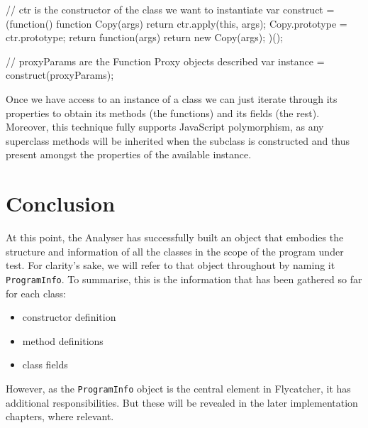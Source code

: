 \begin{code}[caption=Instantiating a \textit{Function} object,label=instantiatingfn]
// ctr is the constructor of the class we want to instantiate
var construct = (function() {
    function Copy(args) {
        return ctr.apply(this, args);
    }
    Copy.prototype = ctr.prototype;
    return function(args) {
        return new Copy(args);
    }
})();

// proxyParams are the Function Proxy objects described
var instance = construct(proxyParams);
\end{code}

Once we have access to an instance of a class we can just iterate through its properties to obtain its methods (the functions) and its fields (the rest). Moreover, this technique fully supports JavaScript polymorphism, as any superclass methods will be inherited when the subclass is constructed and thus present amongst the properties of the available instance.

\section{Conclusion}
At this point, the \textsf{Analyser} has successfully built an object that embodies the structure and information of all the classes in the scope of the program under test. For clarity's sake, we will refer to that object throughout by naming it \texttt{ProgramInfo}. To summarise, this is the information that has been gathered so far for each class:

\begin{itemize}
   \item constructor definition \checkmark
   \item method definitions \checkmark
   \item class fields \checkmark
\end{itemize}

However, as the \texttt{ProgramInfo} object is the central element in \textsf{Flycatcher}, it has additional responsibilities. But these will be revealed in the later implementation chapters, where relevant.
